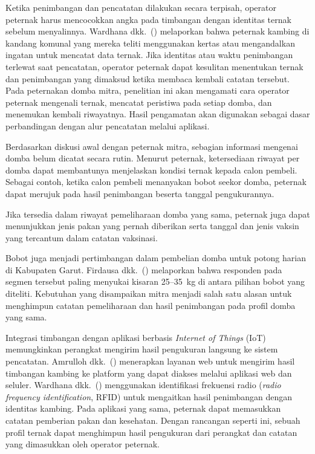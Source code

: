 Ketika penimbangan dan pencatatan dilakukan secara terpisah, {\setlength{\fboxsep}{1pt}\colorbox{revisilama}{operator}} {\setlength{\fboxsep}{1pt}\colorbox{revisibaru}{peternak}} harus
mencocokkan angka pada timbangan dengan identitas ternak sebelum menyalinnya.
Wardhana dkk.~(\citeyear{wardhana2026pemantauan}) melaporkan bahwa peternak
kambing di kandang komunal yang mereka teliti menggunakan kertas atau
mengandalkan ingatan untuk mencatat data ternak. Jika identitas atau waktu
penimbangan terlewat saat pencatatan, {\setlength{\fboxsep}{1pt}\colorbox{revisilama}{operator}} {\setlength{\fboxsep}{1pt}\colorbox{revisibaru}{peternak}} dapat kesulitan menentukan
ternak dan penimbangan yang dimaksud ketika membaca kembali catatan tersebut.
Pada peternakan domba mitra, penelitian ini akan mengamati cara {\setlength{\fboxsep}{1pt}\colorbox{revisilama}{operator}} {\setlength{\fboxsep}{1pt}\colorbox{revisibaru}{peternak}}
mengenali ternak, mencatat peristiwa pada setiap domba, dan menemukan kembali
riwayatnya. Hasil pengamatan akan digunakan sebagai dasar perbandingan dengan
alur pencatatan melalui aplikasi.

Berdasarkan diskusi awal dengan peternak mitra, sebagian informasi mengenai
domba belum dicatat secara rutin. Menurut peternak, ketersediaan riwayat per
domba dapat membantunya menjelaskan kondisi ternak kepada calon pembeli.
Sebagai contoh, ketika calon pembeli menanyakan bobot seekor domba, peternak
dapat merujuk pada hasil penimbangan beserta tanggal pengukurannya.%

Jika tersedia dalam riwayat pemeliharaan domba yang sama, peternak juga dapat
menunjukkan jenis pakan yang pernah diberikan serta tanggal dan jenis vaksin
yang tercantum dalam catatan vaksinasi.

Bobot juga menjadi pertimbangan dalam pembelian domba untuk potong harian di
Kabupaten Garut. Firdausa dkk.~(\citeyear{firdausa2026preferensi}) melaporkan
bahwa responden pada segmen tersebut paling menyukai kisaran 25--35~kg di
antara pilihan bobot yang diteliti. Kebutuhan yang disampaikan mitra menjadi
salah satu alasan untuk menghimpun catatan pemeliharaan dan hasil penimbangan
pada profil domba yang sama.

Integrasi timbangan dengan aplikasi berbasis \textit{Internet of Things}
(IoT) memungkinkan perangkat mengirim hasil pengukuran langsung ke sistem
pencatatan. Amrulloh dkk.~(\citeyear{amrulloh2024integrasi}) menerapkan
layanan web untuk mengirim hasil timbangan kambing ke platform yang dapat
diakses melalui aplikasi web dan seluler. Wardhana
dkk.~(\citeyear{wardhana2026pemantauan}) menggunakan identifikasi frekuensi
radio (\textit{radio frequency identification}, RFID) untuk mengaitkan hasil
penimbangan dengan identitas kambing. Pada aplikasi yang sama, peternak dapat
memasukkan catatan pemberian pakan dan kesehatan. Dengan rancangan seperti
ini, sebuah profil ternak dapat menghimpun hasil pengukuran dari perangkat
dan catatan yang dimasukkan oleh {\setlength{\fboxsep}{1pt}\colorbox{revisilama}{operator}} {\setlength{\fboxsep}{1pt}\colorbox{revisibaru}{peternak}}.

